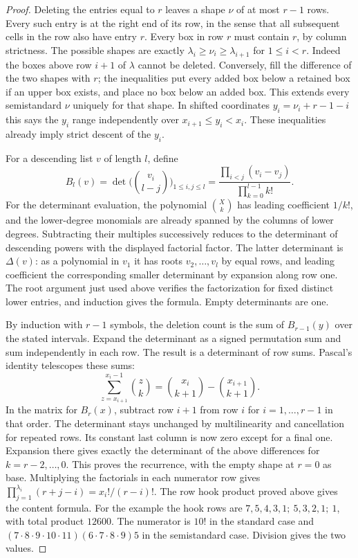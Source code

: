 \begin{proof}
Deleting the entries equal to \(r\) leaves a shape \(\nu\) of at most
\(r-1\) rows. Every such entry is at the right end of its row, in the
sense that all subsequent cells in the row also have entry \(r\).
Every box in row \(r\) must contain \(r\), by column strictness.
The possible shapes are exactly
\(\lambda_i\ge\nu_i\ge\lambda_{i+1}\) for \(1\le i<r\). Indeed the
boxes above row \(i+1\) of \(\lambda\) cannot be deleted. Conversely,
fill the difference of the two shapes with \(r\); the inequalities put
every added box below a retained box if an upper box exists, and place
no box below an added box. This extends every semistandard \(\nu\)
uniquely for that shape. In shifted coordinates
\(y_i=\nu_i+r-1-i\) this says the \(y_i\) range independently over
\(x_{i+1}\le y_i<x_i\). These inequalities already imply strict descent
of the \(y_i\).

For a descending list \(v\) of length \(l\), define
\[
 B_l(v)=\det\bigl(\binom{v_i}{l-j}\bigr)_{1\le i,j\le l}
       =\frac{\prod_{i<j}(v_i-v_j)}{\prod_{k=0}^{l-1}k!}.
\]
For the determinant evaluation, the polynomial \(\binom{X}{k}\) has
leading coefficient \(1/k!\), and the lower-degree monomials are already
spanned by the columns of lower degrees. Subtracting their multiples
successively reduces to the determinant of descending powers with
the displayed factorial factor. The latter determinant is \(\Delta(v)\):
as a polynomial in \(v_1\) it has roots \(v_2,\ldots,v_l\) by equal
rows, and leading coefficient the corresponding smaller determinant
by expansion along row one. The root argument just used above verifies
the factorization for fixed distinct lower entries, and induction gives
the formula. Empty determinants are one.

By induction with \(r-1\) symbols, the deletion count is the sum of
\(B_{r-1}(y)\) over the stated intervals. Expand the determinant as a
signed permutation sum and sum independently in each row. The result
is a determinant of row sums. Pascal's identity telescopes these sums:
\[
 \sum_{z=x_{i+1}}^{x_i-1}\binom zk
   =\binom{x_i}{k+1}-\binom{x_{i+1}}{k+1}.
\]
In the matrix for \(B_r(x)\), subtract row \(i+1\) from row \(i\)
for \(i=1,\ldots,r-1\) in that order. The determinant stays unchanged
by multilinearity and cancellation for repeated rows. Its constant
last column is now zero except for a final one. Expansion there gives
exactly the determinant of the above differences for
\(k=r-2,\ldots,0\). This proves the recurrence, with the empty shape
at \(r=0\) as base. Multiplying the factorials in each numerator row gives
\(\prod_{j=1}^{\lambda_i}(r+j-i)=x_i!/(r-i)!\). The row hook product
proved above gives the content formula. For the example the hook rows
are \(7,5,4,3,1;\ 5,3,2,1;\ 1\), with total product \(12600\).
The numerator is \(10!\) in the standard case and
\((7\cdot8\cdot9\cdot10\cdot11)(6\cdot7\cdot8\cdot9)5\)
in the semistandard case. Division gives the two values.
\end{proof}

